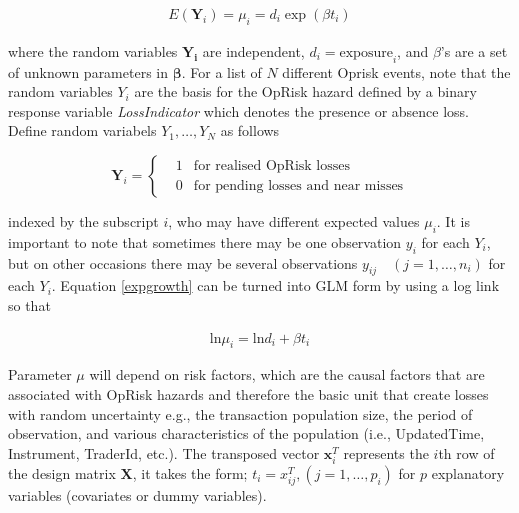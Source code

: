\documentclass{DissertateUSU}
\begin{document}
\singlespacing

\begin{eqnarray}\label{expgrowth}
E(\mathbf{Y}_i) = \mu_i = d_i\exp{(\beta t_i)} 
\end{eqnarray} \doublespacing

where the random variables \(\mathbf{Y_i}\) are independent,
\(d_i = \mbox{exposure}_i\), and \(\beta\)'s are a set of unknown
parameters in \(\mathbf{\beta}\). For a list of \(N\) different Oprisk
events, note that the random variables \(Y_i\) are the basis for the
OpRisk hazard defined by a binary response variable \emph{LossIndicator}
which denotes the presence or absence loss. Define random variabels
\(Y_1,\ldots,Y_N\) as follows

\begin{definition}\label{DefLosInd}
\singlespacing
\begin{equation}\label{LossIndicator}
\mathbf {Y}_i =\left\{\begin{array}{rcl}
                 & 1 & \mbox{for realised OpRisk losses}  \\
                 & 0 & \mbox{for pending losses and near misses} 
                      \end{array}\right.
\end{equation}
\doublespacing
\end{definition}

indexed by the subscript \(i\), who may have different expected values
\(\mu_i\). It is important to note that sometimes there may be one
observation \(y_i\) for each \(Y_i\), but on other occasions there may
be several observations \(y_{ij}\quad(j=1,\ldots,n_i)\) for each
\(Y_i\). Equation \ref{expgrowth} can be turned into GLM form by using a
log link so that

\singlespacing

\begin{eqnarray}\label{linearcombination}
\mbox{ln}\mu_i = \mbox{ln}d_i + \beta t_i
\end{eqnarray} \doublespacing

Parameter \(\mu\) will depend on risk factors, which are the causal
factors that are associated with OpRisk hazards and therefore the basic
unit that create losses with random uncertainty e.g., the transaction
population size, the period of observation, and various characteristics
of the population (i.e., UpdatedTime, Instrument, TraderId, etc.). The
transposed vector \(\mathbf{x}_i^T\) represents the \(i\)th row of the
design matrix \(\mathbf{X}\), it takes the form;
\(t_i = x_{ij}^T, (j=1,\ldots,p_i)\) for \(p\) explanatory variables
(covariates or dummy variables).\medskip
\end{document}
